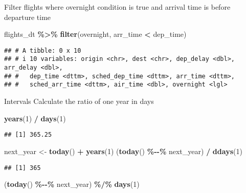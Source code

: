 \documentclass[
]{article}
\newenvironment{Shaded}{\begin{snugshade}}{\end{snugshade}}
\newcommand{\DecValTok}[1]{\textcolor[rgb]{0.00,0.00,0.81}{#1}}
\newcommand{\FunctionTok}[1]{\textcolor[rgb]{0.13,0.29,0.53}{\textbf{#1}}}
\newcommand{\NormalTok}[1]{#1}
\newcommand{\OtherTok}[1]{\textcolor[rgb]{0.56,0.35,0.01}{#1}}
\newcommand{\SpecialCharTok}[1]{\textcolor[rgb]{0.81,0.36,0.00}{\textbf{#1}}}
\begin{document}
Filter flights where overnight condition is true and arrival time is
before departure time

\begin{Shaded}
\begin{Highlighting}[]
\NormalTok{flights\_dt }\SpecialCharTok{\%\textgreater{}\%} 
  \FunctionTok{filter}\NormalTok{(overnight, arr\_time }\SpecialCharTok{\textless{}}\NormalTok{ dep\_time) }
\end{Highlighting}
\end{Shaded}

\begin{verbatim}
## # A tibble: 0 x 10
## # i 10 variables: origin <chr>, dest <chr>, dep_delay <dbl>, arr_delay <dbl>,
## #   dep_time <dttm>, sched_dep_time <dttm>, arr_time <dttm>,
## #   sched_arr_time <dttm>, air_time <dbl>, overnight <lgl>
\end{verbatim}

Intervals Calculate the ratio of one year in days

\begin{Shaded}
\begin{Highlighting}[]
\FunctionTok{years}\NormalTok{(}\DecValTok{1}\NormalTok{) }\SpecialCharTok{/} \FunctionTok{days}\NormalTok{(}\DecValTok{1}\NormalTok{)}
\end{Highlighting}
\end{Shaded}

\begin{verbatim}
## [1] 365.25
\end{verbatim}

\begin{Shaded}
\begin{Highlighting}[]
\NormalTok{next\_year }\OtherTok{\textless{}{-}} \FunctionTok{today}\NormalTok{() }\SpecialCharTok{+} \FunctionTok{years}\NormalTok{(}\DecValTok{1}\NormalTok{)}
\NormalTok{(}\FunctionTok{today}\NormalTok{() }\SpecialCharTok{\%{-}{-}\%}\NormalTok{ next\_year) }\SpecialCharTok{/} \FunctionTok{ddays}\NormalTok{(}\DecValTok{1}\NormalTok{)}
\end{Highlighting}
\end{Shaded}

\begin{verbatim}
## [1] 365
\end{verbatim}

\begin{Shaded}
\begin{Highlighting}[]
\NormalTok{(}\FunctionTok{today}\NormalTok{() }\SpecialCharTok{\%{-}{-}\%}\NormalTok{ next\_year) }\SpecialCharTok{\%/\%} \FunctionTok{days}\NormalTok{(}\DecValTok{1}\NormalTok{)}
\end{Highlighting}
\end{Shaded}
\end{document}
